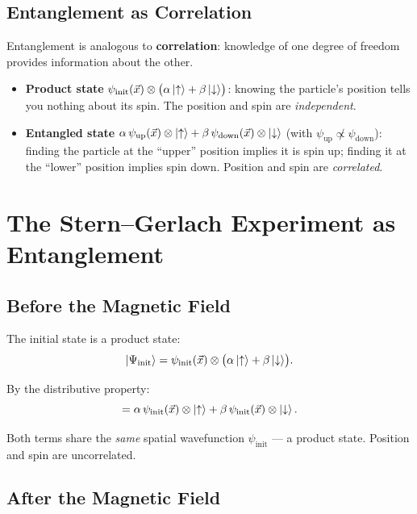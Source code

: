 \documentclass[11pt,a4paper]{article}
\theoremstyle{definition}
\theoremstyle{plain}
\theoremstyle{remark}
\begin{document}
\subsection{Entanglement as Correlation}

Entanglement is analogous to \textbf{correlation}: knowledge of one degree of freedom provides information about the other.

\begin{itemize}
    \item \textbf{Product state} $\psi_{\text{init}}(\vec{x})\otimes\bigl(\alpha\ket{\uparrow} + \beta\ket{\downarrow}\bigr)$: knowing the particle's position tells you nothing about its spin. The position and spin are \emph{independent}.
    \item \textbf{Entangled state} $\alpha\,\psi_{\text{up}}(\vec{x})\otimes\ket{\uparrow} + \beta\,\psi_{\text{down}}(\vec{x})\otimes\ket{\downarrow}$ (with $\psi_{\text{up}} \not\propto \psi_{\text{down}}$): finding the particle at the ``upper'' position implies it is spin up; finding it at the ``lower'' position implies spin down. Position and spin are \emph{correlated}.
\end{itemize}

\section{The Stern--Gerlach Experiment as Entanglement}

\subsection{Before the Magnetic Field}

The initial state is a product state:
\[
    \ket{\Psi_{\text{init}}} = \psi_{\text{init}}(\vec{x})\otimes\bigl(\alpha\ket{\uparrow} + \beta\ket{\downarrow}\bigr).
\]

By the distributive property:
\[
    = \alpha\,\psi_{\text{init}}(\vec{x})\otimes\ket{\uparrow} + \beta\,\psi_{\text{init}}(\vec{x})\otimes\ket{\downarrow}.
\]

Both terms share the \emph{same} spatial wavefunction $\psi_{\text{init}}$ --- a product state. Position and spin are uncorrelated.

\subsection{After the Magnetic Field}
\end{document}
